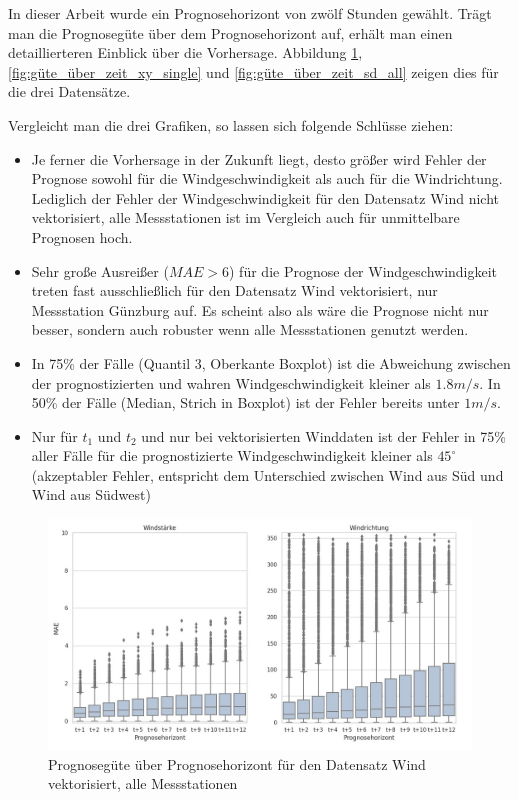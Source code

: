 \documentclass[
12pt, %
toc=listofnumbered, %
toc=chapterentrydotfill, %
numbers=noenddot, %
captions=tableheading, %
bibliography=numbered
]{scrreprt}
\newcommand{\qm}[1]{\glqq#1\grqq{}} %
\begin{document}
In dieser Arbeit wurde ein Prognosehorizont von zwölf Stunden gewählt. Trägt man die Prognosegüte über dem Prognosehorizont auf, erhält man einen detaillierteren Einblick über die Vorhersage. Abbildung \ref{fig:güte_über_zeit_xy_all},  \ref{fig:güte_über_zeit_xy_single} und  \ref{fig:güte_über_zeit_sd_all} zeigen dies für die drei Datensätze.

Vergleicht man die drei Grafiken, so lassen sich folgende Schlüsse ziehen:

\begin{itemize}
	\item Je ferner die Vorhersage in der Zukunft liegt, desto größer wird Fehler der Prognose sowohl für die Windgeschwindigkeit als auch für die Windrichtung. Lediglich der Fehler der Windgeschwindigkeit für den Datensatz \qm{Wind nicht vektorisiert, alle Messstationen} ist im Vergleich auch für unmittelbare Prognosen hoch.
	\item Sehr große Ausreißer ($MAE > 6$) für die Prognose der Windgeschwindigkeit treten fast ausschließlich für den Datensatz \qm{Wind vektorisiert, nur Messstation Günzburg} auf. Es scheint also als wäre die Prognose nicht nur besser, sondern auch robuster wenn alle Messstationen genutzt werden.
	\item In 75\% der Fälle (Quantil 3, Oberkante Boxplot) ist die Abweichung zwischen der prognostizierten und wahren Windgeschwindigkeit kleiner als $1.8 m/s$. In 50\% der Fälle (Median, Strich in Boxplot) ist der Fehler bereits unter $1 m/s$.
	\item Nur für $t_1$ und $t_2$ und nur bei vektorisierten Winddaten ist der Fehler in 75\% aller Fälle für die prognostizierte Windgeschwindigkeit kleiner als $45^\circ$ (\qm{akzeptabler Fehler}, entspricht dem Unterschied zwischen Wind aus Süd und Wind aus Südwest)
\end{itemize}

\begin{figure}[tph]
	\begin{center}
		\includegraphics[width=\linewidth]{./images/Güte über Prognosehorizont sd via xy-cropped.jpg}
		\caption{Prognosegüte über Prognosehorizont für den Datensatz \qm{Wind vektorisiert, alle Messstationen}}
		\label{fig:güte_über_zeit_xy_all}
	\end{center}
\end{figure}
\end{document}

